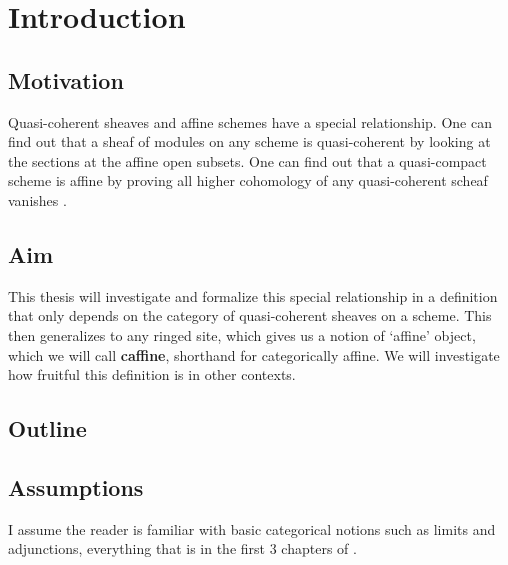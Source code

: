 \chapter{Introduction}

\section{Motivation}
Quasi-coherent sheaves and affine schemes have a special relationship. One can find out that a sheaf of modules on any scheme is quasi-coherent by looking at the sections at the affine open subsets. One can find out that a quasi-compact scheme is affine by proving all higher cohomology of any quasi-coherent scheaf vanishes \cite[Tag 01XF]{stacks}. 

\section{Aim}
This thesis will investigate 
and formalize this special relationship in 
a definition that only depends on the category of quasi-coherent sheaves on a scheme. This then generalizes to any ringed site, which gives us a notion of `affine' object, which we will call \textbf{caffine}, shorthand for categorically affine.
We will investigate how fruitful this definition is in other contexts.

\section{Outline}



\section{Assumptions}
I assume the reader is familiar with basic categorical notions such as limits and adjunctions, 
everything that is in the first 3 chapters of \cite{catsUU}.